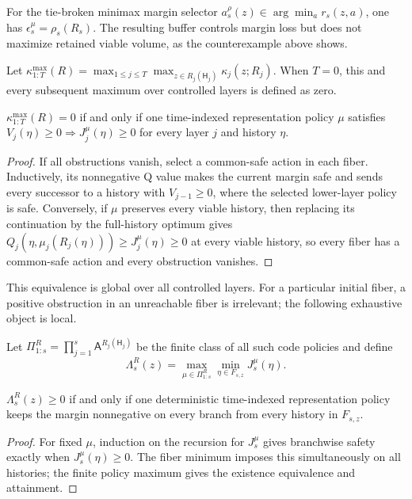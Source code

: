 For the tie-broken minimax margin selector
$a_s^\rho(z)\in\arg\min_a r_s(z,a)$, one has
$\epsilon_s^\mu=\rho_s(R_s)$.  The resulting buffer controls margin loss but does not maximize
retained viable volume, as the counterexample above shows.

Let
$\kappa_{1:T}^{\max}(R)=\max_{1\leq j\leq T}\max_{z\in R_j(\mathsf H_j)}
\kappa_j(z;R_j)$.
When $T=0$, this and every subsequent maximum over controlled layers is defined as zero.
\begin{proposition}
\label{prop:global-sign-preservation}
$\kappa_{1:T}^{\max}(R)=0$ if and only if one time-indexed representation policy $\mu$ satisfies
$V_j(\eta)\geq0\Rightarrow J_j^\mu(\eta)\geq0$ for every layer $j$ and history $\eta$.
\end{proposition}
\begin{proof}
If all obstructions vanish, select a common-safe action in each fiber.  Inductively, its
nonnegative Q value makes the current margin safe and sends every successor to a history with
$V_{j-1}\geq0$, where the selected lower-layer policy is safe.  Conversely, if $\mu$ preserves
every viable history, then replacing its continuation by the full-history optimum gives
$Q_j(\eta,\mu_j(R_j(\eta)))\geq J_j^\mu(\eta)\geq0$ at every viable history, so every fiber has a
common-safe action and every obstruction vanishes.
\end{proof}
This equivalence is global over all controlled layers.  For a particular initial fiber, a positive
obstruction in an unreachable fiber is irrelevant; the following exhaustive object is local.

Let $\Pi_{1:s}^R=\prod_{j=1}^s\mathsf A^{R_j(\mathsf H_j)}$ be the finite class of all such code
policies and define
\begin{equation}
 \Lambda_s^R(z)=\max_{\mu\in\Pi_{1:s}^R}
 \min_{\eta\in F_{s,z}}J_s^\mu(\eta).
 \label{eq:exact-latent-viability}
\end{equation}
\begin{proposition}
\label{prop:exact-representation-viability}
$\Lambda_s^R(z)\geq0$ if and only if one deterministic time-indexed representation policy keeps
the margin nonnegative on every branch from every history in $F_{s,z}$.
\end{proposition}
\begin{proof}
For fixed $\mu$, induction on the recursion for $J_s^\mu$ gives branchwise safety exactly when
$J_s^\mu(\eta)\geq0$.  The fiber minimum imposes this simultaneously on all histories; the finite
policy maximum gives the existence equivalence and attainment.
\end{proof}

